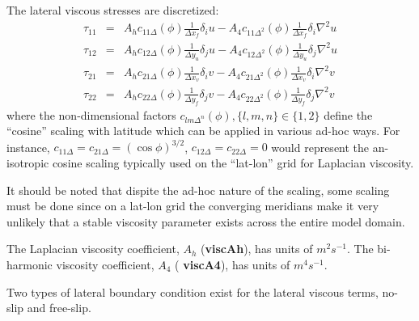 The lateral viscous stresses are discretized:
\begin{eqnarray}
\tau_{11} & = & A_h c_{11\Delta}(\phi) \frac{1}{\Delta x_f} \delta_i u
               -A_4 c_{11\Delta^2}(\phi) \frac{1}{\Delta x_f} \delta_i \nabla^2 u \\
\tau_{12} & = & A_h c_{12\Delta}(\phi) \frac{1}{\Delta y_u} \delta_j u
               -A_4 c_{12\Delta^2}(\phi)\frac{1}{\Delta y_u} \delta_j \nabla^2 u \\
\tau_{21} & = & A_h c_{21\Delta}(\phi) \frac{1}{\Delta x_v} \delta_i v
               -A_4 c_{21\Delta^2}(\phi) \frac{1}{\Delta x_v} \delta_i \nabla^2 v \\
\tau_{22} & = & A_h c_{22\Delta}(\phi) \frac{1}{\Delta y_f} \delta_j v
               -A_4 c_{22\Delta^2}(\phi) \frac{1}{\Delta y_f} \delta_j \nabla^2 v
\end{eqnarray}
where the non-dimensional factors $c_{lm\Delta^n}(\phi), \{l,m,n\} \in
\{1,2\}$ define the ``cosine'' scaling with latitude which can be
applied in various ad-hoc ways. For instance, $c_{11\Delta} =
c_{21\Delta} = (\cos{\phi})^{3/2}$, $c_{12\Delta}=c_{22\Delta}=0$ would
represent the an-isotropic cosine scaling typically used on the
``lat-lon'' grid for Laplacian viscosity.

It should be noted that dispite the ad-hoc nature of the scaling, some
scaling must be done since on a lat-lon grid the converging meridians
make it very unlikely that a stable viscosity parameter exists across
the entire model domain.

The Laplacian viscosity coefficient, $A_h$ ({\bf viscAh}), has units
of $m^2 s^{-1}$. The bi-harmonic viscosity coefficient, $A_4$ ({\bf
viscA4}), has units of $m^4 s^{-1}$.


Two types of lateral boundary condition exist for the lateral viscous
terms, no-slip and free-slip.

